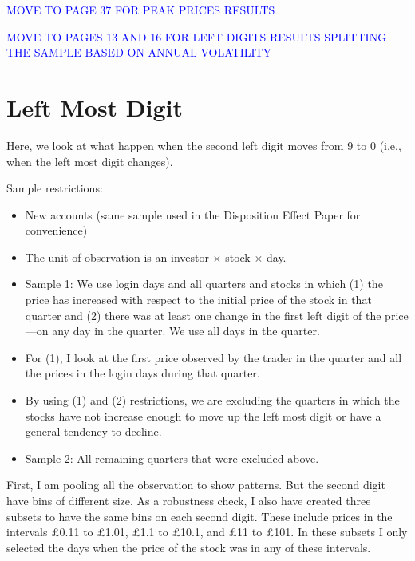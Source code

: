 
\textcolor{blue}{MOVE TO PAGE 37 FOR PEAK PRICES RESULTS}

\textcolor{blue}{MOVE TO PAGES 13 AND 16 FOR LEFT DIGITS RESULTS SPLITTING THE SAMPLE BASED ON ANNUAL VOLATILITY}


\section{Left Most Digit}\label{sec:intro}

	Here, we look at what happen when the second left digit moves from 9 to 0 (i.e., when the left most digit changes).
	
Sample restrictions:

\begin{itemize}
	\item New accounts (same sample used in the Disposition Effect Paper for convenience)
	\item The unit of observation is an investor $\times$ stock $\times$ day. 
	\item Sample 1: We use login days and all quarters and stocks in which (1) the price has increased with respect to the initial price of the stock in that quarter and (2) there was at least one change in the first left digit of the price---on any day in the quarter. We use all days in the quarter.
	
	\item For (1), I look at the first price observed by the trader in the quarter and all the prices in the login days during that quarter.
	\item By using (1) and (2) restrictions, we are excluding the quarters in which the stocks have not increase enough to move up the left most digit or have a general tendency to decline.
	
	\item Sample 2: All remaining quarters that were excluded above.
	
	
\end{itemize}	

	


First, I am pooling all the observation to show patterns. But the second digit have bins of different size. As a robustness check, I also have created three subsets to have the same bins on each second digit. These include prices in the intervals £0.11 to £1.01, £1.1 to £10.1, and £11 to £101. In these subsets I only selected the days when the price of the stock was in any of these intervals.



